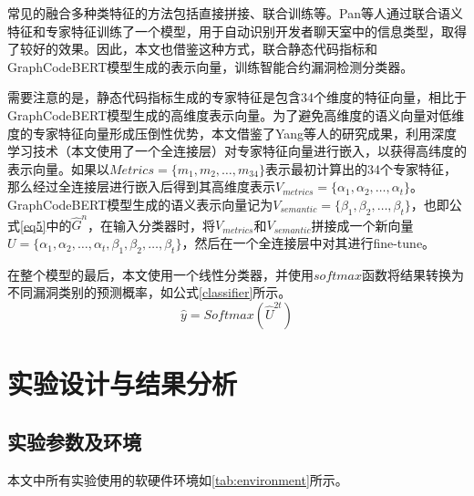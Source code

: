常见的融合多种类特征的方法包括直接拼接、联合训练等。Pan等人通过联合语义特征和专家特征训练了一个模型，用于自动识别开发者聊天室中的信息类型，取得了较好的效果。因此，本文也借鉴这种方式，联合静态代码指标和GraphCodeBERT模型生成的表示向量，训练智能合约漏洞检测分类器。

需要注意的是，静态代码指标生成的专家特征是包含34个维度的特征向量，相比于GraphCodeBERT模型生成的高维度表示向量。为了避免高维度的语义向量对低维度的专家特征向量形成压倒性优势，本文借鉴了Yang等人\cite{yang2015}的研究成果，利用深度学习技术（本文使用了一个全连接层）对专家特征向量进行嵌入，以获得高纬度的表示向量。如果以$Metrics=\{m_1,m_2,\ldots,m_{34}\}$表示最初计算出的34个专家特征，那么经过全连接层进行嵌入后得到其高维度表示$V_{metrics}=\{\alpha_1,\alpha_2,\ldots,\alpha_t\}$。GraphCodeBERT模型生成的语义表示向量记为$V_{semantic}=\{\beta_1,\beta_2,\ldots,\beta_t\}$，也即公式\eqref{eq5}中的$\hat{G}^n$，在输入分类器时，将$V_{metrics}$和$V_{semantic}$拼接成一个新向量$U=\{\alpha_1,\alpha_2,\ldots,\alpha_t,\beta_1,\beta_2,\ldots,\beta_t\}$，然后在一个全连接层中对其进行fine-tune。

在整个模型的最后，本文使用一个线性分类器，并使用$softmax$函数将结果转换为不同漏洞类别的预测概率，如公式\eqref{classifier}所示。
\begin{equation}
\hat{y}=Softmax(\hat{U}^{2t}) \label{classifier}
\end{equation}
\section{实验设计与结果分析}
\label{sec:实验设计与结果分析}


\subsection{实验参数及环境}
\label{sec:实验参数及环境}
本文中所有实验使用的软硬件环境如\autoref{tab:environment}所示。

